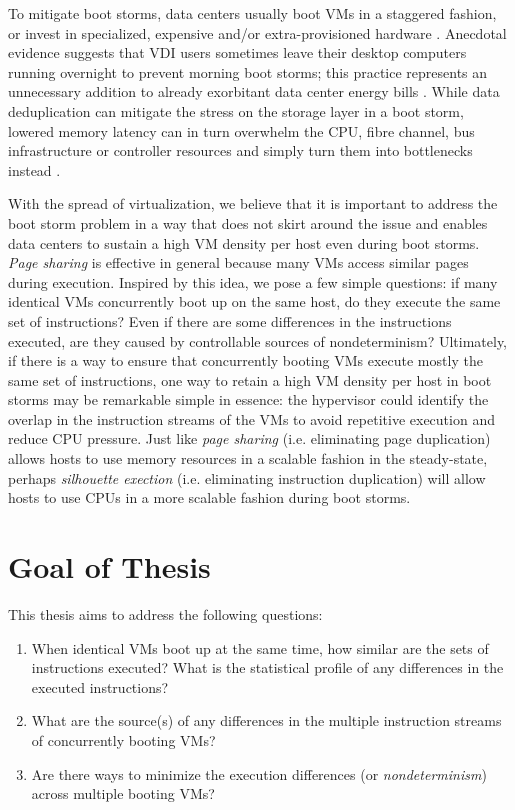 To mitigate boot storms, data centers usually
boot VMs in a staggered fashion, or invest in specialized,
expensive and/or extra-provisioned hardware \cite{highperfnas, liao2011vmstore}.
Anecdotal evidence suggests that VDI users sometimes leave their desktop computers running
overnight to prevent morning boot storms; this practice
represents an unnecessary addition to already exorbitant
data center energy bills \cite{qureshi2009bills}. 
While data deduplication \cite{clements2009deduplication}
can mitigate the stress on the storage layer in
a boot storm, lowered memory latency can in turn overwhelm the CPU, 
fibre channel, bus infrastructure or controller resources 
and simply turn them into bottlenecks instead \cite{netappstorm}. 

With the spread of virtualization, we believe that it is important to address the
boot storm problem in a way that does not skirt around the issue
and enables data centers to sustain a high VM density per host even
during boot storms. {\em Page sharing} is effective
in general because many VMs access similar pages during execution.
Inspired by this idea, we pose a few simple questions: 
if many identical VMs concurrently boot up on the same host,
do they execute the same set of instructions? Even if there are
some differences in the instructions executed, are they caused by
controllable sources of nondeterminism? Ultimately, if there is a way
to ensure that concurrently booting VMs execute mostly the same set of instructions,
 one way to retain a high VM density 
per host in boot storms may be remarkable simple in essence:
the hypervisor could identify the overlap in the instruction streams of 
the VMs to avoid repetitive execution and reduce
CPU pressure. Just like {\em page sharing} (i.e. eliminating page
duplication) allows hosts to use memory resources in a scalable fashion in
the steady-state, perhaps {\em silhouette exection} (i.e. eliminating
instruction duplication) will allow hosts to use CPUs in a more scalable fashion during boot storms.

\section{Goal of Thesis}
This thesis aims to address the following questions:

\begin{enumerate}

\item When identical VMs boot up at the same time, how similar
are the sets of instructions executed? What is the statistical
profile of any differences in the executed instructions?

\item What are the source(s) of any differences in
the multiple instruction streams of concurrently booting VMs?

\item Are there ways to minimize the execution differences (or {\em nondeterminism})
across multiple booting VMs?

\end{enumerate}

